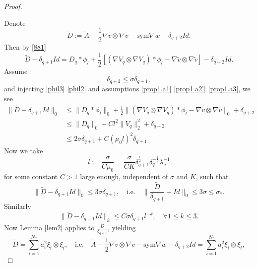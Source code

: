 \documentclass[10pt,a4paper]{amsart}
\newcommand{\sym}{\text{sym}}
\begin{document}
\begin{proof}
\begin{rem}
\end{rem}
Denote
\begin{equation*}
    \tilde D := \tilde A-\frac{1}{2} \nabla\tilde v\otimes\nabla\tilde v-\sym\nabla\tilde w-\delta_{q+2}Id.
\end{equation*}
Then by \eqref{881}
\begin{equation*}
    \tilde D-\delta_{q+1}Id= D_q*\phi_l+\frac{1}{2}[(\nabla V_q\otimes\nabla V_q)*\phi_l-\nabla\tilde v\otimes\nabla\tilde v]-\delta_{q+2}Id.
\end{equation*}
Assume
\begin{equation}\label{ineq02}
    \delta_{q+2}\le {\sigma}\delta_{q+1},
\end{equation}
and injecting \eqref{phil3} \eqref{phil2} and assumptions \eqref{prop1.a1} \eqref{prop1.a2'} \eqref{prop1.a3}, we see
\begin{align*}
    \|\tilde D-\delta_{q+1}Id\|_0
    &\le \|D_q*\phi_l\|_0+\frac{1}{2}\|(\nabla V_q\otimes\nabla V_q)*\phi_l-\nabla\tilde v\otimes\nabla\tilde v\|_0+\delta_{q+2}\\
    &\le \|D_q\|_0 + Cl^2\|V_q\|_2^2 + \delta_{q+2}\\
    &\le 2{\sigma}\delta_{q+1}+C(\mu_0 l)^2\delta_{q+1}
\end{align*}
Now we take
\begin{equation}\label{l}
    l:=\frac{\sigma}{C\mu_0} = \frac{\sigma}{CK}\delta_{q+1}^\frac{1}{2}\delta_q^{-\frac{1}{2}}\lambda_q^{-1}
\end{equation}
for some constant $C>1$ large enough, independent of $\sigma$ and $K$,  
such that
\begin{equation*}
    \|\tilde D-\delta_{q+1}Id\|_0\le 3\sigma\delta_{q+1},
    \quad\text{i.e.}\quad
    \|\frac{\tilde D}{\delta_{q+1}}-Id\|_0\le 3\sigma\le\sigma_*.
\end{equation*}
Similarly 
\begin{equation*}
    \|\tilde D-\delta_{q+1}Id\|_k \le C\sigma\delta_{q+1}l^{-k},\quad\forall 1\le k\le 3.
\end{equation*}
Now Lemma \ref{lem2} applies to $\frac{\tilde D}{\delta_{q+1}}$, yielding
\begin{equation}\label{882}
    \tilde D=\sum_{i=1}^{N_*}a_i^2\xi_i\otimes\xi_i,\quad\text{i.e.}\quad
    \tilde A-\frac{1}{2} \nabla\tilde v\otimes\nabla\tilde v-\sym\nabla\tilde w-\delta_{q+2}Id=\sum_{i=1}^{N_*}a_i^2\xi_i\otimes\xi_i,

\end{equation}
\end{proof}
\end{document}

